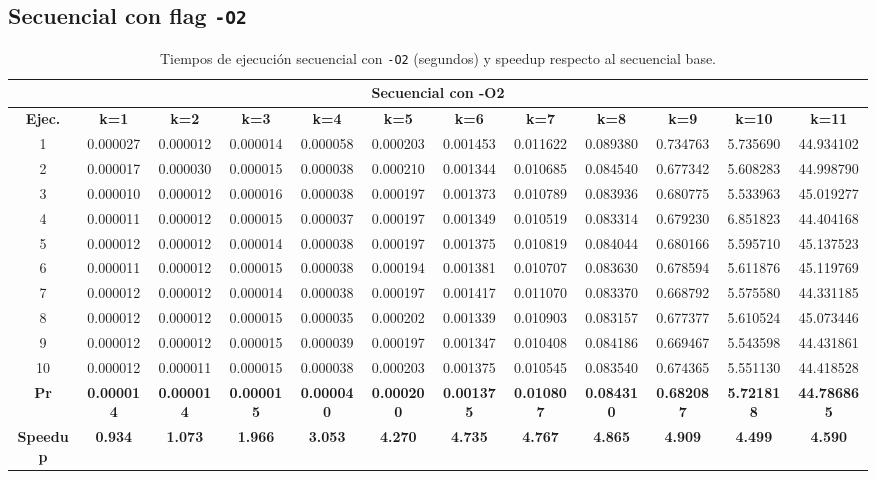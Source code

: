 \documentclass{article}
\begin{document}
\subsection{Secuencial con flag \texttt{-O2}}

\begin{table}[H]
\centering
\tiny
\begin{tabular}{|c|c|c|c|c|c|c|c|c|c|c|c|}
\hline
\multicolumn{12}{|c|}{\textbf{Secuencial con -O2}} \\
\hline
\textbf{Ejec.} & \textbf{k=1} & \textbf{k=2} & \textbf{k=3} & \textbf{k=4} & \textbf{k=5} & \textbf{k=6} & \textbf{k=7} & \textbf{k=8} & \textbf{k=9} & \textbf{k=10} & \textbf{k=11} \\
\hline
1  & 0.000027 & 0.000012 & 0.000014 & 0.000058 & 0.000203 & 0.001453 & 0.011622 & 0.089380 & 0.734763 & 5.735690 & 44.934102 \\
2  & 0.000017 & 0.000030 & 0.000015 & 0.000038 & 0.000210 & 0.001344 & 0.010685 & 0.084540 & 0.677342 & 5.608283 & 44.998790 \\
3  & 0.000010 & 0.000012 & 0.000016 & 0.000038 & 0.000197 & 0.001373 & 0.010789 & 0.083936 & 0.680775 & 5.533963 & 45.019277 \\
4  & 0.000011 & 0.000012 & 0.000015 & 0.000037 & 0.000197 & 0.001349 & 0.010519 & 0.083314 & 0.679230 & 6.851823 & 44.404168 \\
5  & 0.000012 & 0.000012 & 0.000014 & 0.000038 & 0.000197 & 0.001375 & 0.010819 & 0.084044 & 0.680166 & 5.595710 & 45.137523 \\
6  & 0.000011 & 0.000012 & 0.000015 & 0.000038 & 0.000194 & 0.001381 & 0.010707 & 0.083630 & 0.678594 & 5.611876 & 45.119769 \\
7  & 0.000012 & 0.000012 & 0.000014 & 0.000038 & 0.000197 & 0.001417 & 0.011070 & 0.083370 & 0.668792 & 5.575580 & 44.331185 \\
8  & 0.000012 & 0.000012 & 0.000015 & 0.000035 & 0.000202 & 0.001339 & 0.010903 & 0.083157 & 0.677377 & 5.610524 & 45.073446 \\
9  & 0.000012 & 0.000012 & 0.000015 & 0.000039 & 0.000197 & 0.001347 & 0.010408 & 0.084186 & 0.669467 & 5.543598 & 44.431861 \\
10 & 0.000012 & 0.000011 & 0.000015 & 0.000038 & 0.000203 & 0.001375 & 0.010545 & 0.083540 & 0.674365 & 5.551130 & 44.418528 \\
\hline
\textbf{Pr} & \textbf{0.000014} & \textbf{0.000014} & \textbf{0.000015} & \textbf{0.000040} & \textbf{0.000200} & \textbf{0.001375} & \textbf{0.010807} & \textbf{0.084310} & \textbf{0.682087} & \textbf{5.721818} & \textbf{44.786865} \\
\hline
\textbf{Speedup} & \textbf{0.934} & \textbf{1.073} & \textbf{1.966} & \textbf{3.053} & \textbf{4.270} & \textbf{4.735} & \textbf{4.767} & \textbf{4.865} & \textbf{4.909} & \textbf{4.499} & \textbf{4.590} \\
\hline
\end{tabular}
\caption{Tiempos de ejecución secuencial con \texttt{-O2} (segundos) y speedup respecto al secuencial base.}
\label{tab:secuencial_flag}
\end{table}
\end{document}
